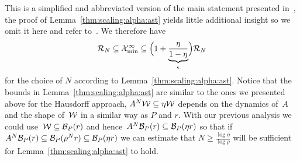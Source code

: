 %
\noindent This is a simplified and abbreviated version of the main statement presented in~\cite{Schulze-Darup:2016}, the proof of Lemma~\ref{thm:scaling:alpha:ast} yields little additional insight so we omit it here and refer to~\cite{Schulze-Darup:2016}.
%
We therefore have
%
\begin{equation}
	\mathcal R_N\subseteq \mathcal X^\infty_{\min} \subseteq \Bigl(1+\underbrace{\frac{\eta}{1-\eta}}_{\epsilon}\Bigr)\mathcal R_N
\end{equation}
%
for the choice of $N$ according to Lemma~\ref{thm:scaling:alpha:ast}.
%
Notice that the bounds in Lemma~\ref{thm:scaling:alpha:ast} are similar to the ones we presented above for the Hausdorff approach, $A^N\mathcal W\subseteq\eta\mathcal W$ depends on the dynamics of~$A$ and the shape of~$\mathcal W$ in a similar way as $P$ and $r$.
%
With our previous analysis we could use~$\mathcal W\subseteq\mathcal B_P(r)$ and hence~$A^N\mathcal B_P(r)\subseteq\mathcal B_P(\eta r)$ so that if $A^N\mathcal B_P(r)\subseteq\mathcal B_P(\rho^{N} r)\subseteq\mathcal B_P(\eta r)$ we can estimate that $N\geq\frac{\log\eta}{\log\rho}$ will be sufficient for Lemma~\ref{thm:scaling:alpha:ast} to hold.
%
%
%
%

